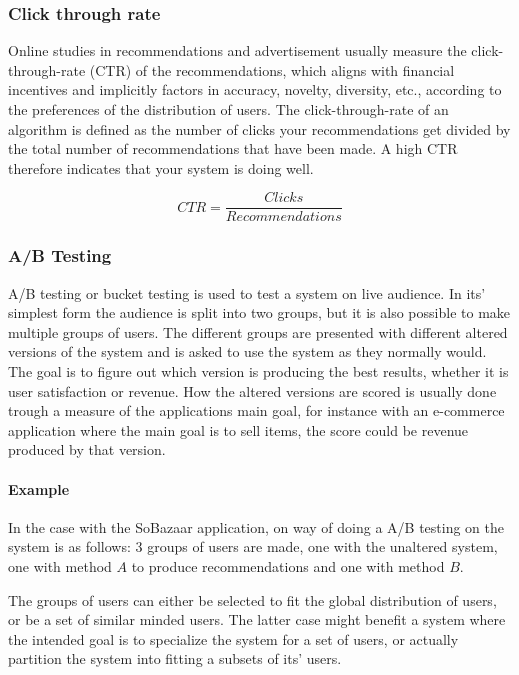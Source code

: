 \subsubsection{Click through rate}

Online studies in recommendations and advertisement usually measure the
click-through-rate (CTR) of the recommendations, which aligns with financial
incentives and implicitly factors in accuracy, novelty, diversity, etc.,
according to the preferences of the distribution of users.  The
click-through-rate of an algorithm is defined as the number of clicks your
recommendations get divided by the total number of recommendations that have
been made. A high CTR therefore indicates that your system is doing well.

\begin{equation}
CTR = \frac{Clicks}{Recommendations}
\end{equation}

\subsubsection{A/B Testing}

A/B testing or bucket testing is used to test a system on live audience.  In
its' simplest form the audience is split into two groups, but it is also
possible to make multiple groups of users.  The different groups are presented
with different altered versions of the system and is asked to use the system as
they normally would.  The goal is to figure out which version is producing the
best results, whether it is user satisfaction or revenue.  How the altered
versions are scored is usually done trough a measure of the applications main
goal, for instance with an e-commerce application where the main goal is to
sell items, the score could be revenue produced by that version.

\paragraph{Example}
In the case with the SoBazaar application, on way of doing a A/B testing on the
system is as follows: 3 groups of users are made, one with the unaltered
system, one with method $A$ to produce recommendations and one with method $B$.

The groups of users can either be selected to fit the global distribution of
users, or be a set of similar minded users.  The latter case might benefit a
system where the intended goal is to specialize the system for a set of users,
or actually partition the system into fitting a subsets of its' users.

